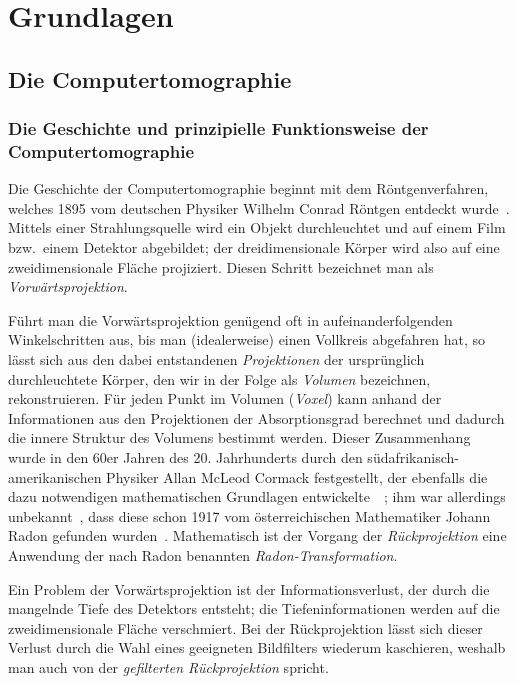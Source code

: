 \chapter{Grundlagen}

\section{Die Computertomographie}

\subsection{Die Geschichte und prinzipielle Funktionsweise der Computertomographie}

Die Geschichte der Computertomographie beginnt mit dem Röntgenverfahren, welches 1895 vom deutschen Physiker Wilhelm
Conrad Röntgen entdeckt wurde~\cite{roentgen}. Mittels einer Strahlungsquelle wird ein Objekt durchleuchtet und auf
einem Film bzw.\ einem Detektor abgebildet; der dreidimensionale Körper wird also auf eine zweidimensionale Fläche
projiziert. Diesen Schritt bezeichnet man als \textit{Vorwärtsprojektion}.

Führt man die Vorwärtsprojektion genügend oft in aufeinanderfolgenden Winkelschritten aus, bis man (idealerweise) einen
Vollkreis abgefahren hat, so lässt sich aus den dabei entstandenen \textit{Projektionen} der ursprünglich durchleuchtete
Körper, den wir in der Folge als \textit{Volumen} bezeichnen, rekonstruieren. Für jeden Punkt im Volumen
(\textit{Voxel}) kann anhand der Informationen aus den Projektionen der Absorptionsgrad berechnet und dadurch die
innere Struktur des Volumens bestimmt werden. Dieser Zusammenhang wurde in den 60er Jahren des 20. Jahrhunderts durch
den südafrikanisch-amerikanischen Physiker Allan McLeod Cormack festgestellt, der ebenfalls die dazu notwendigen
mathematischen Grundlagen entwickelte~\cite{cormack63}~\cite{cormack64}; ihm war allerdings unbekannt~\cite{cormack79},
dass diese schon 1917 vom österreichischen Mathematiker Johann Radon gefunden wurden~\cite{radon}. Mathematisch ist der
Vorgang der \textit{Rückprojektion} eine Anwendung der nach Radon benannten \textit{Radon-Transformation}.

Ein Problem der Vorwärtsprojektion ist der Informationsverlust, der durch die mangelnde Tiefe des Detektors entsteht;
die Tiefeninformationen werden auf die zweidimensionale Fläche {\glqq}verschmiert{\grqq}. Bei der Rückprojektion lässt
sich dieser Verlust durch die Wahl eines geeigneten Bildfilters wiederum kaschieren, weshalb man auch von der
\textit{gefilterten Rückprojektion} spricht.

